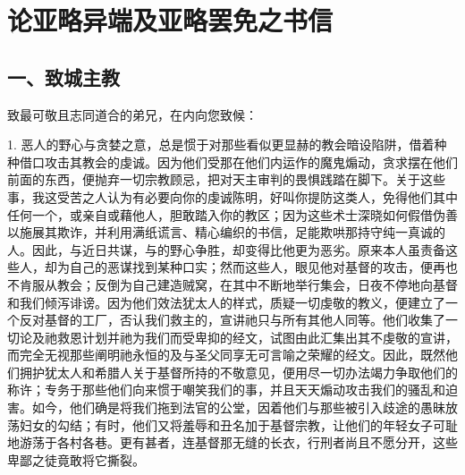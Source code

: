 
\chapter{论亚略异端及亚略罢免之书信}



\section{一、致城主教}

致最可敬且志同道合的弟兄，在内向您致候：\par

1. 恶人的野心与贪婪之意，总是惯于对那些看似更显赫的教会暗设陷阱，借着种种借口攻击其教会的虔诚。因为他们受那在他们内运作的魔鬼煽动，贪求摆在他们前面的东西，便抛弃一切宗教顾忌，把对天主审判的畏惧践踏在脚下。关于这些事，我这受苦之人认为有必要向你的虔诚陈明，好叫你提防这类人，免得他们其中任何一个，或亲自或藉他人，胆敢踏入你的教区；因为这些术士深晓如何假借伪善以施展其欺诈，并利用满纸谎言、精心编织的书信，足能欺哄那持守纯一真诚的人。因此，与近日共谋，与的野心争胜，却变得比他更为恶劣。原来本人虽责备这些人，却为自己的恶谋找到某种口实；然而这些人，眼见他对基督的攻击，便再也不肯服从教会；反倒为自己建造贼窝，在其中不断地举行集会，日夜不停地向基督和我们倾泻诽谤。因为他们效法犹太人的样式，质疑一切虔敬的教义，便建立了一个反对基督的工厂，否认我们救主的，宣讲祂只与所有其他人同等。他们收集了一切论及祂救恩计划并祂为我们而受卑抑的经文，试图由此汇集出其不虔敬的宣讲，而完全无视那些阐明祂永恒的及与圣父同享无可言喻之荣耀的经文。因此，既然他们拥护犹太人和希腊人关于基督所持的不敬意见，便用尽一切办法竭力争取他们的称许；专务于那些他们向来惯于嘲笑我们的事，并且天天煽动攻击我们的骚乱和迫害。如今，他们确是将我们拖到法官的公堂，因着他们与那些被引入歧途的愚昧放荡妇女的勾结；有时，他们又将羞辱和丑名加于基督宗教，让他们的年轻女子可耻地游荡于各村各巷。更有甚者，连基督那无缝的长衣，行刑者尚且不愿分开，这些卑鄙之徒竟敢将它撕裂。\par

